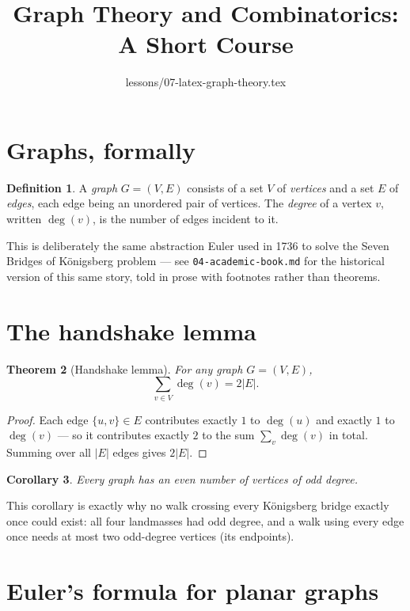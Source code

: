 \documentclass[11pt]{article}
\title{Graph Theory and Combinatorics: A Short Course}
\author{lessons/07-latex-graph-theory.tex}
\date{}
\newtheorem{theorem}{Theorem}[section]
\newtheorem{corollary}[theorem]{Corollary}
\theoremstyle{definition}
\newtheorem{definition}[theorem]{Definition}
\begin{document}
\maketitle

\section{Graphs, formally}

\begin{definition}
A \emph{graph} $G = (V, E)$ consists of a set $V$ of \emph{vertices} and a
set $E$ of \emph{edges}, each edge being an unordered pair of vertices. The
\emph{degree} of a vertex $v$, written $\deg(v)$, is the number of edges
incident to it.
\end{definition}

This is deliberately the same abstraction Euler used in 1736 to solve the
Seven Bridges of K\"onigsberg problem — see \texttt{04-academic-book.md} for
the historical version of this same story, told in prose with footnotes
rather than theorems.

\section{The handshake lemma}

\begin{theorem}[Handshake lemma]
For any graph $G = (V, E)$,
\[
  \sum_{v \in V} \deg(v) = 2|E|.
\]
\end{theorem}

\begin{proof}
Each edge $\{u, v\} \in E$ contributes exactly $1$ to $\deg(u)$ and exactly
$1$ to $\deg(v)$ — so it contributes exactly $2$ to the sum
$\sum_{v} \deg(v)$ in total. Summing over all $|E|$ edges gives $2|E|$.
\end{proof}

\begin{corollary}
Every graph has an even number of vertices of odd degree.
\end{corollary}

This corollary is exactly why no walk crossing every K\"onigsberg bridge
exactly once could exist: all four landmasses had odd degree, and a walk
using every edge once needs at most two odd-degree vertices (its endpoints).

\section{Euler's formula for planar graphs}
\end{document}
